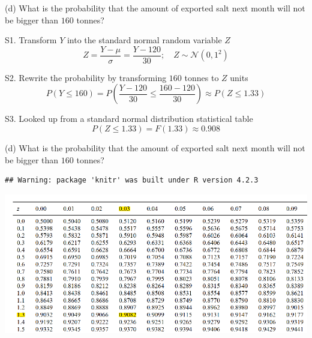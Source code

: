 \documentclass[
  11pt,
  ignorenonframetext,
]{beamer}
\begin{document}
\begin{frame}{(d) What is the probability that the amount of exported
salt next month will not be bigger than \(160\) tonnes?}
\protect\hypertarget{d-what-is-the-probability-that-the-amount-of-exported-salt-next-month-will-not-be-bigger-than-160-tonnes}{}
\normalsize

S1. Transform \(Y\) into the standard normal random variable \(Z\)
\small \[
Z = \frac{Y - \mu}{\sigma} = \frac{Y - 120}{30}; \quad Z \sim \mathcal{N}(0,1^2)
\]

\normalsize

S2. Rewrite the probability by transforming \(160\) tonnes to \(Z\)
units \small \[
P(Y \leq 160) = P\left(\frac{Y - 120}{30} \leq \frac{160 - 120}{30}\right) \approx P\left(Z \leq 1.33\right)
\]

\normalsize

S3. Looked up from a standard normal distribution statistical table
\small \[
P\left(Z \leq 1.33\right) = F(1.33) \approx 0.908
\]
\end{frame}

\begin{frame}[fragile]{(d) What is the probability that the amount of
exported salt next month will not be bigger than \(160\) tonnes?}
\protect\hypertarget{d-what-is-the-probability-that-the-amount-of-exported-salt-next-month-will-not-be-bigger-than-160-tonnes-1}{}
\begin{verbatim}
## Warning: package 'knitr' was built under R version 4.2.3
\end{verbatim}

\begin{center}\includegraphics[width=0.9\linewidth]{pictures/Zat1.33} \end{center}
\end{frame}
\end{document}
